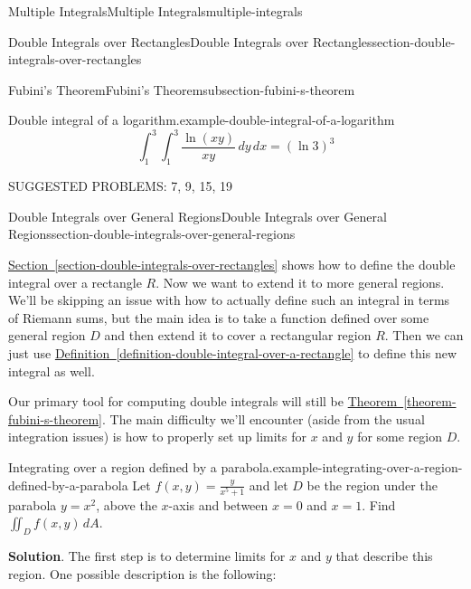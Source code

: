 \documentclass[oneside,10pt,]{book}
\numberwithin{equation}{section}
\begin{document}
\begin{chapterptx}{Multiple Integrals}{}{Multiple Integrals}{}{}{multiple-integrals}
\begin{sectionptx}{Double Integrals over Rectangles}{}{Double Integrals over Rectangles}{}{}{section-double-integrals-over-rectangles}
\begin{subsectionptx}{Fubini's Theorem}{}{Fubini's Theorem}{}{}{subsection-fubini-s-theorem}
\begin{example}{Double integral of a logarithm.}{example-double-integral-of-a-logarithm}
\begin{equation*}
\int_{1}^{3}\int_{1}^{3}\frac{\ln(xy)}{xy}\,dy\,dx = (\ln3)^{3}
\end{equation*}
\end{example}
\end{subsectionptx}
\begin{conclusion}{}%
\hypertarget{p-1473}{}%
SUGGESTED PROBLEMS: 7, 9, 15, 19%
\end{conclusion}%
\end{sectionptx}
%
%
\typeout{************************************************}
\typeout{************************************************}
%
\begin{sectionptx}{Double Integrals over General Regions}{}{Double Integrals over General Regions}{}{}{section-double-integrals-over-general-regions}
\begin{conclusion}{}%
\hypertarget{p-1474}{}%
\hyperref[section-double-integrals-over-rectangles]{Section~\ref{section-double-integrals-over-rectangles}} shows how to define the double integral over a rectangle \(R\). Now we want to extend it to more general regions. We'll be skipping an issue with how to actually define such an integral in terms of Riemann sums, but the main idea is to take a function defined over some general region \(D\) and then extend it to cover a rectangular region \(R\). Then we can just use \hyperref[definition-double-integral-over-a-rectangle]{Definition~\ref{definition-double-integral-over-a-rectangle}} to define this new integral as well.%
\par
\hypertarget{p-1475}{}%
Our primary tool for computing double integrals will still be \hyperref[theorem-fubini-s-theorem]{Theorem~\ref{theorem-fubini-s-theorem}}. The main difficulty we'll encounter (aside from the usual integration issues) is how to properly set up limits for \(x\) and \(y\) for some region \(D\).%
\end{conclusion}%
\begin{example}{Integrating over a region defined by a parabola.}{example-integrating-over-a-region-defined-by-a-parabola}%
\hypertarget{p-1476}{}%
Let \(f(x,y) = \frac{y}{x^{5}+1}\) and let \(D\) be the region under the parabola \(y = x^{2}\), above the \(x\)-axis and between \(x=0\) and \(x=1\). Find \(\iint_{D}f(x,y)\,dA\).%
\par\smallskip%
\noindent\textbf{Solution}.\hypertarget{solution-241}{}\quad%
\hypertarget{p-1477}{}%
The first step is to determine limits for \(x\) and \(y\) that describe this region. One possible description is the following:%

\end{example}
\end{sectionptx}
\end{chapterptx}
\end{document}
